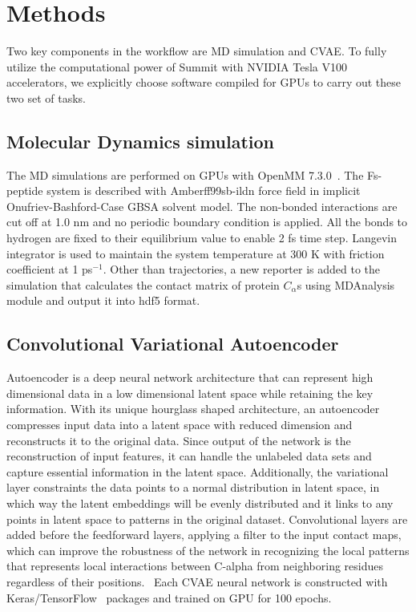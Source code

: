 \documentclass[conference,final]{IEEEtran}
\begin{document}
\section{Methods} 

Two key components in the workflow are MD simulation and CVAE. To fully
utilize the computational power of Summit with NVIDIA Tesla V100
accelerators, we explicitly choose software compiled for GPUs to carry out
these two set of tasks.


\subsection{Molecular Dynamics simulation}

The MD simulations are performed on GPUs with OpenMM
7.3.0~\cite{eastman2017openmm}. The Fs-peptide system is described with 
Amberff99sb-ildn force field in implicit Onufriev-Bashford-Case GBSA solvent 
model. The non-bonded 
interactions are cut off at 1.0 nm and no periodic boundary condition is
applied. All the bonds to hydrogen are fixed to their equilibrium value to
enable 2 fs time step. Langevin integrator is used to maintain the system
temperature at 300 K with friction coefficient at 1 ps$^{-1}$. Other than
trajectories, a new reporter is added to the simulation that calculates the 
contact matrix of protein $C_{\alpha}$s using 
MDAnalysis~\cite{michaud2011mdanalysis,gowers2016mdanalysis} 
module and output it into hdf5 format. 

\subsection{Convolutional Variational Autoencoder}

Autoencoder is a deep neural network architecture that can represent high
dimensional data in a low dimensional latent space while retaining the key
information. With its unique hourglass shaped architecture, an autoencoder
compresses input data into a latent space with reduced dimension and
reconstructs it to the original data. Since output of the network is the
reconstruction of input features, it can handle the unlabeled data sets and
capture essential information in the latent space. Additionally, the
variational layer constraints the data points to a normal distribution in
latent space, in which way the latent embeddings will be evenly distributed
and it links to any points in latent space to patterns in the original
dataset. Convolutional layers are added before the feedforward layers,
applying a filter to the input contact maps, which can improve the robustness
of the network in recognizing the local patterns that represents local
interactions between C-alpha from neighboring residues regardless of their
positions.~\cite{bhowmik2018deep}  Each CVAE neural network is constructed with Keras/TensorFlow~\cite{chollet2015keras,abadi2016tensorflow}
packages and trained on GPU for 100 epochs.
\end{document}
